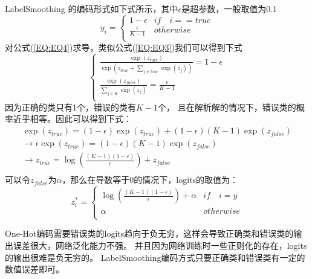 \documentclass{article}
\begin{document}
LabelSmoothing 的编码形式如下式所示，其中$\epsilon$是超参数，一般取值为0.1
\begin{equation}
    y_i = \begin{cases}
        1-\epsilon  & if \quad i==true \\
        \frac{\epsilon}{K-1} & otherwise\\
    \end{cases}
    \label{EQ:EQ4}
\end{equation}
对公式(\ref{EQ:EQ4})求导，类似公式(\ref{EQ:EQ3})我们可以得到下式
\begin{equation}
    \begin{cases}
        \frac{\exp(z_{ture})}{\exp(z_{true} + \sum_{j \neq true} \exp(z_j))} = 1 - \epsilon \\
        \frac{\exp (z_{false})}{\sum_{j \in K} \exp (z_j)} = \frac{\epsilon}{K-1}\\
    \end{cases}
\end{equation}
因为正确的类只有1个，错误的类有$K-1$个， 且在解析解的情况下，错误类的概率近乎相等。因此可以得到下式：
\begin{equation}
    \begin{split}
        \exp(z_{true}) = (1-\epsilon) \exp(z_{true}) + (1-\epsilon)(K-1)\exp(z_{false}) \\
        \rightarrow \epsilon \exp(z_{true}) = (1-\epsilon)(K-1)\exp(z_{false})\\
        \rightarrow z_{true} = \log (\frac{(K-1)(1-\epsilon)}{\epsilon}) + z_{false}\\
    \end{split}
\end{equation}
可以令$z_{false}$为$\alpha$，那么在导数等于0的情况下，logits的取值为：
\begin{equation}
    z_i^{*} = \begin{cases}
        \log (\frac{(K-1)(1-\epsilon)}{\epsilon}) + \alpha & if \quad i=y \\
        \alpha & otherwise\\
    \end{cases}
\end{equation}

\begin{tcolorbox}[title = Conclusion]
    One-Hot编码需要错误类的logits趋向于负无穷，这样会导致正确类和错误类的输出误差很大，网络泛化能力不强。
    并且因为网络训练时一些正则化的存在，logits的输出很难是负无穷的。
    LabelSmoothing编码方式只要正确类和错误类有一定的数值误差即可。
\end{tcolorbox}



\end{document}
